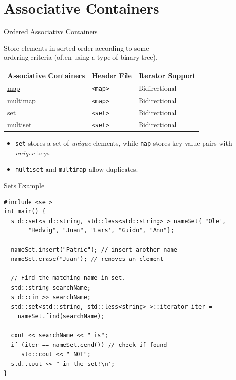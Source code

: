 \documentclass[14pt,aspectratio=1610]{beamer}
\begin{document}
\section{Associative Containers}

\begin{frame}{Ordered Associative Containers}

Store elements in sorted order according to some\\ ordering criteria (often using a type of binary tree).\\[1em]

\begin{tabular}{l l l}
\toprule%
  \textbf{Associative Containers} & \textbf{Header File} & \textbf{Iterator Support}\\
\midrule%
  \href{https://en.cppreference.com/w/cpp/container/map}{map}
    & \lstinline{<map>} & Bidirectional\\
  \href{https://en.cppreference.com/w/cpp/container/multima}{multimap}
    & \lstinline{<map>} & Bidirectional\\
  \href{https://en.cppreference.com/w/cpp/container/set}{set}
    & \lstinline{<set>} & Bidirectional\\
  \href{https://en.cppreference.com/w/cpp/container/multiset}{multiset}
    & \lstinline{<set>} & Bidirectional\\
\bottomrule%
\end{tabular}

\begin{itemize}
\item
  \lstinline{set} stores a set of \emph{unique} elements, while \lstinline{map} stores key-value pairs with \emph{unique} keys.
\item
  \lstinline{multiset} and \lstinline{multimap} allow duplicates.
\end{itemize}

\end{frame}

\begin{frame}[fragile]{Sets Example}
\small
\begin{lstlisting}[basicstyle=\footnotesize\ttfamily]
#include <set>
int main() {
  std::set<std::string, std::less<std::string> > nameSet{ "Ole",
       "Hedvig", "Juan", "Lars", "Guido", "Ann"};

  nameSet.insert("Patric"); // insert another name
  nameSet.erase("Juan"); // removes an element

  // Find the matching name in set.
  std::string searchName;
  std::cin >> searchName;
  std::set<std::string, std::less<string> >::iterator iter =
    nameSet.find(searchName);

  cout << searchName << " is";
  if (iter == nameSet.cend()) // check if found
     std::cout << " NOT";
  std::cout << " in the set!\n";
}
\end{lstlisting}
\end{frame}
\end{document}
